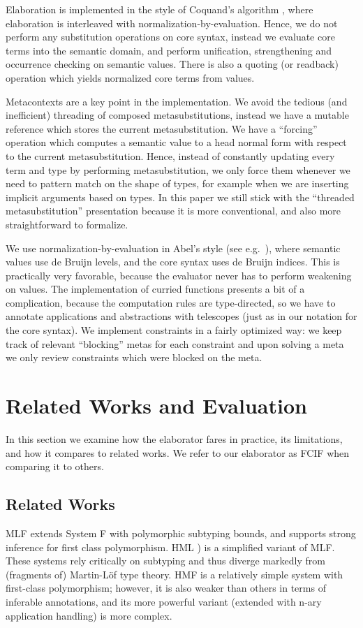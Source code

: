 \documentclass[acmsmall,screen,dvipsnames]{acmart}\settopmatter{}
\theoremstyle{remark}
\begin{document}
Elaboration is implemented in the style of Coquand's algorithm
\cite{coquand1996algorithm}, where elaboration is interleaved with
normalization-by-evaluation. Hence, we do not perform any substitution
operations on core syntax, instead we evaluate core terms into the semantic
domain, and perform unification, strengthening and occurrence checking on
semantic values. There is also a quoting (or readback) operation which yields
normalized core terms from values.

Metacontexts are a key point in the implementation. We avoid the tedious (and
inefficient) threading of composed metasubstitutions, instead we have a mutable
reference which stores the current metasubstitution. We have a ``forcing''
operation which computes a semantic value to a head normal form with respect to
the current metasubstitution. Hence, instead of constantly updating every term
and type by performing metasubstitution, we only force them whenever we need to
pattern match on the shape of types, for example when we are inserting implicit
arguments based on types. In this paper we still stick with the ``threaded
metasubstitution'' presentation because it is more conventional, and also more
straightforward to formalize.

We use normalization-by-evaluation in Abel's style (see
e.g.\ \cite[Chapter~3]{abel2013normalization}), where semantic values use de
Bruijn levels, and the core syntax uses de Bruijn indices. This is practically
very favorable, because the evaluator never has to perform weakening on values.
The implementation of curried functions presents a bit of a complication,
because the computation rules are type-directed, so we have to annotate
applications and abstractions with telescopes (just as in our notation for the
core syntax). We implement constraints in a fairly optimized way: we keep track
of relevant ``blocking'' metas for each constraint and upon solving a meta we
only review constraints which were blocked on the meta.

\section{Related Works and Evaluation}
\label{sec:impl_and_eval}

In this section we examine how the elaborator fares in practice, its
limitations, and how it compares to related works. We refer to our elaborator as
FCIF when comparing it to others.

\subsection{Related Works}
MLF \cite{le2014mlf} extends System F with polymorphic subtyping
bounds, and supports strong inference for first class polymorphism. HML
\cite{leijen2009flexible}) is a simplified variant of MLF. These systems rely
critically on subtyping and thus diverge markedly from (fragments of) Martin-L\"of
type theory. HMF \cite{leijen2008hmf} is a relatively simple system with
first-class polymorphism; however, it is also weaker than others in terms of
inferable annotations, and its more powerful variant (extended with n-ary
application handling) is more complex.
\end{document}
